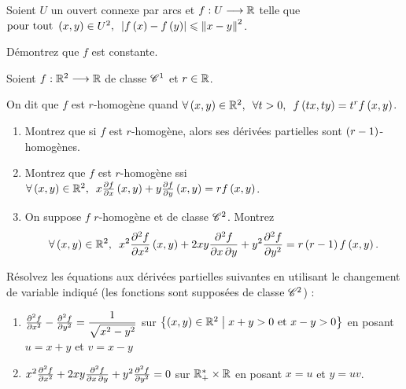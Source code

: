 \begin{exoss}
Soient \(U\) un ouvert connexe par arcs et \(f:U\longrightarrow\mathbb{R}\) telle que \(\quantifs{\tpt\paren{x,y}\in U^2}\abs{f\paren{x}-f\paren{y}}\leq\norme{x-y}^2\).

Démontrez que \(f\) est constante.
\end{exoss}

\begin{exoss}
Soient \(f:\mathbb{R}^2\longrightarrow\mathbb{R}\) de classe \(\mathscr{C}^{1}\) et \(r\in\mathbb{R}\).

On dit que \(f\) est \(r\)-homogène quand \(\quantifs{\forall\paren{x,y}\in\R^2;\forall t>0}f\paren{tx,ty}=t^rf\paren{x,y}\).

\begin{enumerate}
    \item Montrez que si \(f\) est \(r\)-homogène, alors ses dérivées partielles sont \(\left(r-1\right)\)-homogènes. \\
    \item Montrez que \(f\) est \(r\)-homogène ssi \(\quantifs{\forall\paren{x,y}\in\R^2}x\pdv{f}{x}\paren{x,y}+y\pdv{f}{y}\paren{x,y}=rf\paren{x,y}\). \\
    \item On suppose \(f\) \(r\)-homogène et de classe \(\mathscr{C}^{2}\). Montrez \[\quantifs{\forall\paren{x,y}\in\R^2}x^2\pdv[order=2]{f}{x}\paren{x,y}+2xy\pdv{f}{x,y}+y^2\pdv[order=2]{f}{y}=r\paren{r-1}f\paren{x,y}.\]
\end{enumerate}
\end{exoss}

\begin{exoss}
Résolvez les équations aux dérivées partielles suivantes en utilisant le changement de variable indiqué (les fonctions sont supposées de classe \(\mathscr{C}^{2}\)) :

\begin{enumerate}
    \item \(\pdv[order=2]{f}{x}-\pdv[order=2]{f}{y}=\dfrac{1}{\sqrt{x^2-y^2}}\) sur \(\left\lbrace\left(x,y\right)\in\mathbb{R}^2\;\middle|\; x+y>0\text{ et }x-y>0\right\rbrace\) en posant \(u=x+y\) et \(v=x-y\) \\
    \item \(x^2\pdv[order=2]{f}{x}+2xy\pdv{f}{x,y}+y^2\pdv[order=2]{f}{y}=0\) sur \(\mathbb{R}_+^*\times\mathbb{R}\) en posant \(x=u\) et \(y=uv\).
\end{enumerate}
\end{exoss}

